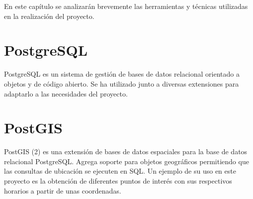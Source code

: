 
En este capítulo se analizarán brevemente las herramientas y técnicas utilizadas en la realización del proyecto.

\section{PostgreSQL}
PostgreSQL \cite{wiki:postgresql} es un sistema de gestión de bases de datos relacional orientado a objetos y de código abierto.
Se ha utilizado junto a diversas extensiones para adaptarlo a las necesidades del proyecto.

\section{PostGIS}
PostGIS (2) es una extensión de bases de datos espaciales para la base de datos relacional PostgreSQL. Agrega soporte para objetos geográficos permitiendo que las consultas de ubicación se ejecuten en SQL.
Un ejemplo de su uso en este proyecto es la obtención de diferentes puntos de interés con sus respectivos horarios a partir de unas coordenadas.